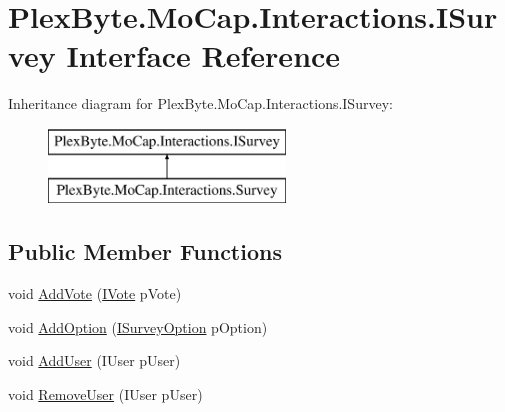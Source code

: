 \hypertarget{interface_plex_byte_1_1_mo_cap_1_1_interactions_1_1_i_survey}{}\section{Plex\+Byte.\+Mo\+Cap.\+Interactions.\+I\+Survey Interface Reference}
\label{interface_plex_byte_1_1_mo_cap_1_1_interactions_1_1_i_survey}
Inheritance diagram for Plex\+Byte.\+Mo\+Cap.\+Interactions.\+I\+Survey\+:\begin{figure}[H]
\begin{center}
\leavevmode
\includegraphics[height=2.000000cm]{interface_plex_byte_1_1_mo_cap_1_1_interactions_1_1_i_survey}
\end{center}
\end{figure}
\subsection*{Public Member Functions}
\begin{DoxyCompactItemize}
\item 
void \hyperlink{interface_plex_byte_1_1_mo_cap_1_1_interactions_1_1_i_survey_ab9df3eb58a1c66b14412cd1bd26f038c}{Add\+Vote} (\hyperlink{interface_plex_byte_1_1_mo_cap_1_1_interactions_1_1_i_vote}{I\+Vote} p\+Vote)
\item 
void \hyperlink{interface_plex_byte_1_1_mo_cap_1_1_interactions_1_1_i_survey_a19e6f79d6fc9ba6c8947894a0ab0d811}{Add\+Option} (\hyperlink{interface_plex_byte_1_1_mo_cap_1_1_interactions_1_1_i_survey_option}{I\+Survey\+Option} p\+Option)
\item 
void \hyperlink{interface_plex_byte_1_1_mo_cap_1_1_interactions_1_1_i_survey_a252050839e9167b57648e150a65385ea}{Add\+User} (I\+User p\+User)
\item 
void \hyperlink{interface_plex_byte_1_1_mo_cap_1_1_interactions_1_1_i_survey_a0e4b923ee86fb5031f0eaa9e3c81dbbd}{Remove\+User} (I\+User p\+User)
\end{DoxyCompactItemize}
